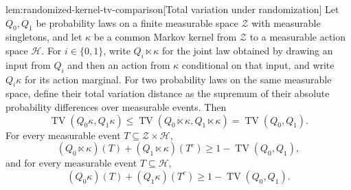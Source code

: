 \documentclass[11pt]{article}
\begin{document}
\begin{lemmav}{lem:randomized-kernel-tv-comparison}[Total variation under randomization]
Let \(Q_0,Q_1\) be probability laws on a finite measurable space \(\mathcal Z\) with measurable singletons, and let \(\kappa\) be a common Markov kernel from \(\mathcal Z\) to a measurable action space \(\mathcal H\). For \(i\in\{0,1\}\), write \(Q_i\ltimes\kappa\) for the joint law obtained by drawing an input from \(Q_i\) and then an action from \(\kappa\) conditional on that input, and write \(Q_i\kappa\) for its action marginal. For two probability laws on the same measurable space, define their total variation distance as the supremum of their absolute probability differences over measurable events. Then
\[
\operatorname{TV}(Q_0\kappa,Q_1\kappa)
\le
\operatorname{TV}(Q_0\ltimes\kappa,Q_1\ltimes\kappa)
=
\operatorname{TV}(Q_0,Q_1).
\]
For every measurable event \(T\subseteq\mathcal Z\times\mathcal H\),
\[
(Q_0\ltimes\kappa)(T)+(Q_1\ltimes\kappa)(T^c)
\ge 1-\operatorname{TV}(Q_0,Q_1),
\]
and for every measurable event \(T\subseteq\mathcal H\),
\[
(Q_0\kappa)(T)+(Q_1\kappa)(T^c)
\ge 1-\operatorname{TV}(Q_0,Q_1).
\]
\end{lemmav}
\end{document}
